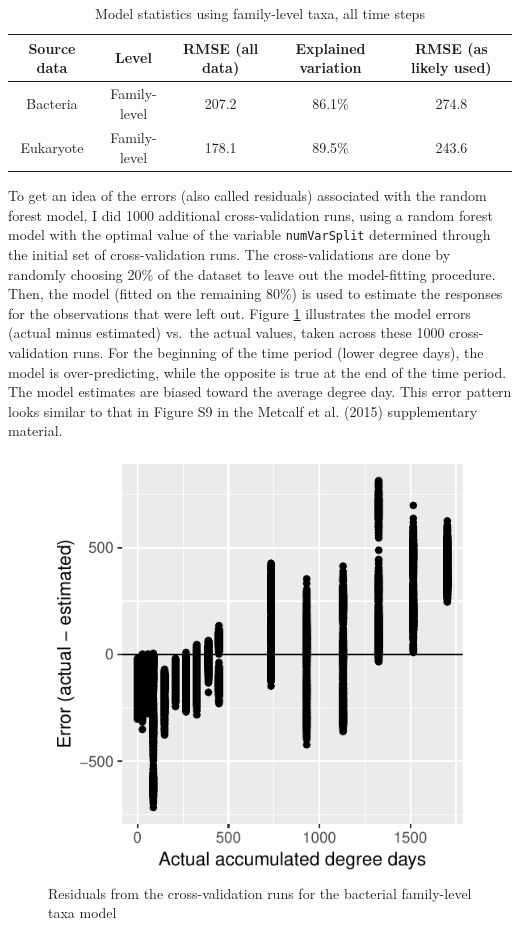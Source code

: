 \documentclass{article}
\begin{document}
\begin{table}
  \centering
\caption{\label{tbl:family_all_data_model_stats}Model statistics using family-level taxa, all time steps}
\begin{tabular}{ccccc}
Source data & Level & RMSE (all data) & Explained variation & RMSE (as likely used)\\ \hline
Bacteria  & Family-level & 207.2 & 86.1\% & 274.8\\
Eukaryote & Family-level & 178.1 & 89.5\% & 243.6 %
\end{tabular}
\end{table}

To get an idea of the errors (also called residuals) associated with
the random forest model, I did 1000 additional cross-validation runs,
using a random forest model with the optimal value of the variable
\texttt{numVarSplit} determined through the initial set of
cross-validation runs.  The cross-validations are done by randomly
choosing 20\% of the dataset to leave out the model-fitting procedure.
Then, the model (fitted on the remaining 80\%) is used to estimate the
responses for the observations that were left out.  Figure
\ref{fig:resids_cv_bac_family_taxa} illustrates the model errors
(actual minus estimated) vs.~the actual values, taken across these
1000 cross-validation runs.  For the beginning of the time period
(lower degree days), the model is over-predicting, while the opposite
is true at the end of the time period.  The model estimates are biased
toward the average degree day.  This error pattern looks similar to
that in Figure S9 in the Metcalf et al. (2015) supplementary material.

\begin{figure}
  \centering
  \includegraphics{../revise_algorithm/only_families/all_time_steps/hit_1perc_twice/orig_units_all_data_families_residuals}
  \caption{Residuals from the cross-validation runs for the bacterial
    family-level taxa model}
  \label{fig:resids_cv_bac_family_taxa}
\end{figure}
\end{document}
